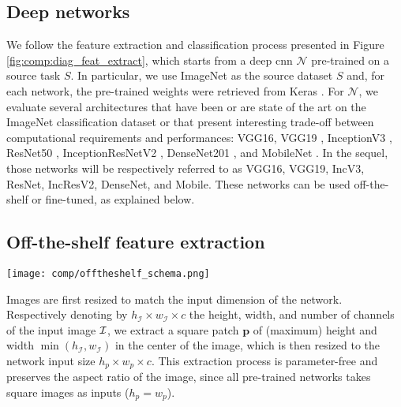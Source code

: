 \label{sec:comp:methods}






 
\subsection{Deep networks}
We follow the feature extraction and classification process presented in Figure \ref{fig:comp:diag_feat_extract}, which starts from a deep \acrshort{cnn} $\mathcal{N}$ pre-trained on a source task $S$. In particular, we use ImageNet as the source dataset $S$ and, for each network, the pre-trained weights were retrieved from Keras \parencite{chollet2015keras}. For $\mathcal{N}$, we evaluate several architectures that have been or are state of the art on the ImageNet classification dataset \parencite{deng2009imagenet} or that present interesting trade-off between computational requirements and performances: VGG16, VGG19 \parencite{simonyan2014very}, InceptionV3 \parencite{szegedy2016rethinking}, ResNet50 \parencite{he2016deep}, InceptionResNetV2 \parencite{szegedy2017inception}, DenseNet201 \parencite{huang2017densely}, and MobileNet \parencite{howard2017mobilenets}. In the sequel, those networks will be respectively referred to as VGG16, VGG19, IncV3, ResNet, IncResV2, DenseNet, and Mobile. These networks can be used off-the-shelf or fine-tuned, as explained below.

\subsection{Off-the-shelf feature extraction}

 \begin{figure*}
   \center
   \texttt{[image: comp/offtheshelf\_schema.png]}
     \caption{Feature extraction from pre-trained convolutional neural networks}
     \label{fig:comp:diag_feat_extract}
 \end{figure*}


Images are first resized to match the input dimension of the network. Respectively denoting by $h_{\mathcal{I}} \times w_{\mathcal{I}} \times c$ the height, width, and number of channels of the input image ${\cal I}$, we extract a square patch $\mathbf{p}$ of (maximum) height and width $\min(h_{\mathcal{I}}, w_{\mathcal{I}})$ in the center of the image, which is then resized to the network input size $h_p\times w_p\times c$. This extraction process is parameter-free and preserves the aspect ratio of the image, since all pre-trained networks takes square images as inputs (\ie $h_p=w_p$).

